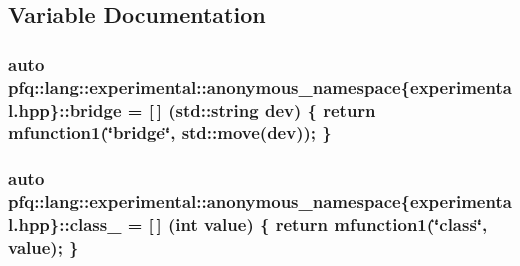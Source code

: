 \subsection{Variable Documentation}
\hypertarget{namespacepfq_1_1lang_1_1experimental_1_1anonymous__namespace_02experimental_8hpp_03_a03fc8960a5fbbe59f000bd9c5a74b7fe}{
\subsubsection[{bridge}]{\setlength{\rightskip}{0pt plus 5cm}auto pfq\+::lang\+::experimental\+::anonymous\+\_\+namespace\{experimental.\+hpp\}\+::bridge = \mbox{[}$\,$\mbox{]} (std\+::string dev) \{ return {\bf mfunction1}(\char`\"{}bridge\char`\"{}, std\+::move(dev)); \}}}\label{namespacepfq_1_1lang_1_1experimental_1_1anonymous__namespace_02experimental_8hpp_03_a03fc8960a5fbbe59f000bd9c5a74b7fe}
\hypertarget{namespacepfq_1_1lang_1_1experimental_1_1anonymous__namespace_02experimental_8hpp_03_a55ce0b220b42a47460d1d40d3d5fdd5d}{
\subsubsection[{class\+\_\+}]{\setlength{\rightskip}{0pt plus 5cm}auto pfq\+::lang\+::experimental\+::anonymous\+\_\+namespace\{experimental.\+hpp\}\+::class\+\_\+ = \mbox{[}$\,$\mbox{]} (int value) \{ return {\bf mfunction1}(\char`\"{}class\char`\"{}, value); \}}}\label{namespacepfq_1_1lang_1_1experimental_1_1anonymous__namespace_02experimental_8hpp_03_a55ce0b220b42a47460d1d40d3d5fdd5d}
